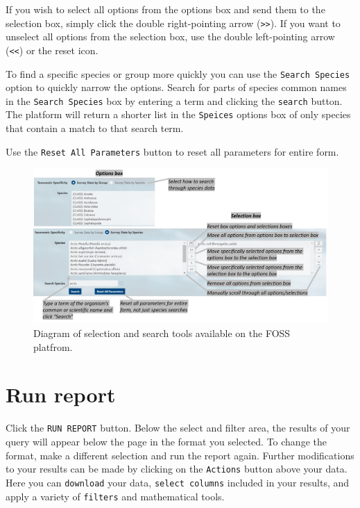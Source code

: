 \documentclass[
  letterpaper,
  oneside,
  open=any]{scrbook}
\begin{document}
If you wish to select all options from the options box and send them to
the selection box, simply click the double right-pointing arrow
(\texttt{\textgreater{}\textgreater{}}). If you want to unselect all
options from the selection box, use the double left-pointing arrow
(\texttt{\textless{}\textless{}}) or the reset icon.

To find a specific species or group more quickly you can use the
\texttt{Search\ Species} option to quickly narrow the options. Search
for parts of species common names in the \texttt{Search\ Species} box by
entering a term and clicking the \texttt{search} button. The platform
will return a shorter list in the \texttt{Speices} options box of only
species that contain a match to that search term.

Use the \texttt{Reset\ All\ Parameters} button to reset all parameters
for entire form.

\begin{figure}[H]

{\centering \includegraphics[width=6.72in,height=\textheight]{content/../img/foss_2_catch_select_species.png}

}

\caption{Diagram of selection and search tools available on the FOSS
platfrom.}

\end{figure}%

\section{Run report}\label{run-report}

Click the \texttt{RUN\ REPORT} button. Below the select and filter area,
the results of your query will appear below the page in the format you
selected. To change the format, make a different selection and run the
report again. Further modifications to your results can be made by
clicking on the \texttt{Actions} button above your data. Here you can
\texttt{download} your data, \texttt{select\ columns} included in your
results, and apply a variety of \texttt{filters} and mathematical tools.
\end{document}

